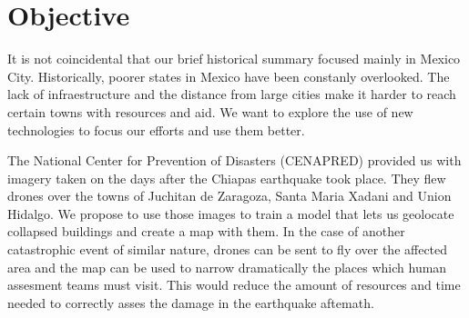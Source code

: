 \begin{figure}[h]
  \begin{center}
  \end{center}
\end{figure}


\section{Objective}

It is not coincidental that our brief historical summary focused mainly in Mexico City. Historically, poorer states in Mexico have been constanly overlooked. The lack of infraestructure and the distance from large cities make it harder to reach certain towns with resources and aid. We want to explore the use of new technologies to focus our efforts and use them better. 

The National Center for Prevention of Disasters (CENAPRED) provided us with imagery taken on the days after the Chiapas earthquake took place. They flew drones over the towns of Juchitan de Zaragoza, Santa Maria Xadani and Union Hidalgo. We propose to use those images to train a model that lets us geolocate collapsed buildings and create a map with them. In the case of another catastrophic event of similar nature, drones can be sent to fly over the affected area and the map can be used to narrow dramatically the places which human assesment teams must visit. This would reduce the amount of resources and time needed to correctly asses the damage in the earthquake aftemath.

